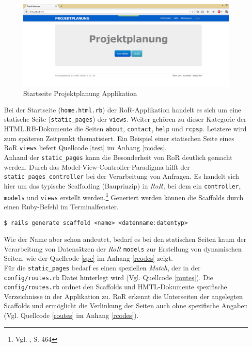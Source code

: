 \documentclass[a4paper,12pt,parskip,bibtotoc,liststotoc]{article}
\begin{document}
\begin{figure}[h!]
  \begin{center}
    \includegraphics[width=150mm]{Bilder/Startseite_unsigned.png}
    \caption{Startseite Projektplanung Applikation}  \label{Start}
  \end{center}
\end{figure}

Bei der Startseite (\texttt{home.html.rb}) der RoR-Applikation handelt es sich um eine statische Seite (\texttt{static\_pages}) der \texttt{views}. Weiter gehören zu dieser Kategorie der HTML.RB-Dokumente die Seiten \texttt{about}, \texttt{contact}, \texttt{help} und \texttt{rcpsp}. Letztere wird zum späteren Zeitpunkt thematisiert. Ein Beispiel einer statischen Seite eines RoR \texttt{views} liefert Quellcode \ref{test} im Anhang \ref{rcodes}.\\

Anhand der \texttt{static\_pages} kann die Besonderheit von RoR deutlich gemacht werden. Durch das Model-View-Controller-Paradigma hilft der \texttt{static\_pages\_controller} bei der Verarbeitung von Anfragen. Es handelt sich hier um das typische Scaffolding (Bauprinzip) in \textit{RoR}, bei dem ein \texttt{controller}, \texttt{models} und \texttt{views} erstellt werden.\footnote{Vgl. \cite{walter2008ruby}, S. 464} Generiert werden können die Scaffolds durch  einen Ruby-Befehl im Terminalfenster.
\begin{lstlisting}[style=Befehl]
$ rails generate scaffold <name> <datenname:datentyp> 
\end{lstlisting}

Wie der Name aber schon andeutet, bedarf es bei den statischen Seiten kaum der Verarbeitung von Datensätzen der \textit{RoR} \texttt{models} zur Erstellung von dynamischen Seiten, wie der Quellcode \ref{spc} im Anhang \ref{rcodes} zeigt.\\

Für die \texttt{static\_pages} bedarf es einen speziellen \textit{Match}, der in der \texttt{config/routes.rb} Datei hinterlegt wird (Vgl. Quellcode \ref{routes}). Die \texttt{config/routes.rb} ordnet den Scaffolds und HMTL-Dokumente spezifische Verzeichnisse in der Applikation zu. RoR erkennt die Unterseiten der angelegten Scaffolds und ermöglicht die Verlinkung der Seiten auch ohne spezifische Angaben (Vgl. Quellcode \ref{routes} im Anhang \ref{rcodes}).\\
\end{document}
